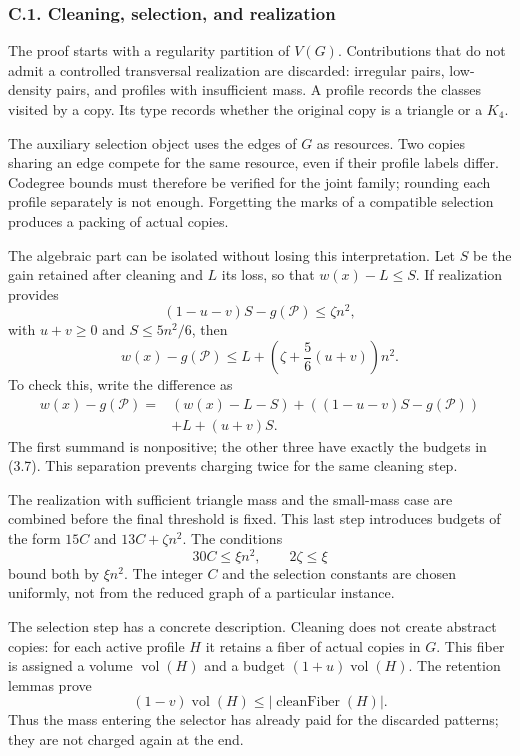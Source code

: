 \documentclass[english,11pt,a4paper]{article}
\begin{document}
\subsubsection{C.1. Cleaning, selection, and realization}\label{c.1.-cleaning-selection-and-realization}

The proof starts with a regularity partition of \(V(G)\). Contributions that do not admit a controlled transversal realization are discarded: irregular pairs, low-density pairs, and profiles with insufficient mass. A profile records the classes visited by a copy. Its type records whether the original copy is a triangle or a \(K_4\).

The auxiliary selection object uses the edges of \(G\) as resources. Two copies sharing an edge compete for the same resource, even if their profile labels differ. Codegree bounds must therefore be verified for the joint family; rounding each profile separately is not enough. Forgetting the marks of a compatible selection produces a packing of actual copies.

The algebraic part can be isolated without losing this interpretation. Let \(S\) be the gain retained after cleaning and \(L\) its loss, so that \(w(x)-L\le S\). If realization provides \[
(1-u-v)S-g(\mathcal P)\le\zeta n^2,
\] with \(u+v\ge0\) and \(S\le5n^2/6\), then \[
w(x)-g(\mathcal P)
\le L+\left(\zeta+\frac56(u+v)\right)n^2.
\tag{3.7}
\] To check this, write the difference as \[
\begin{aligned}
w(x)-g(\mathcal P)
={}&(w(x)-L-S)+((1-u-v)S-g(\mathcal P))\\
&+L+(u+v)S.
\end{aligned}
\] The first summand is nonpositive; the other three have exactly the budgets in (3.7). This separation prevents charging twice for the same cleaning step.

The realization with sufficient triangle mass and the small-mass case are combined before the final threshold is fixed. This last step introduces budgets of the form \(15C\) and \(13C+\zeta n^2\). The conditions \[
30C\le\xi n^2,\qquad 2\zeta\le\xi
\] bound both by \(\xi n^2\). The integer \(C\) and the selection constants are chosen uniformly, not from the reduced graph of a particular instance.

The selection step has a concrete description. Cleaning does not create abstract copies: for each active profile \(H\) it retains a fiber of actual copies in \(G\). This fiber is assigned a volume \(\operatorname{vol}(H)\) and a budget \((1+u)\operatorname{vol}(H)\). The retention lemmas prove \[
(1-v)\operatorname{vol}(H)
\le |\operatorname{cleanFiber}(H)|.
\tag{3.8}
\] Thus the mass entering the selector has already paid for the discarded patterns; they are not charged again at the end.
\end{document}

